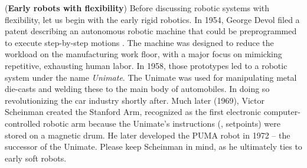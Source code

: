 (\textbf{Early robots with flexibility}) Before discussing robotic systems with flexibility, let us begin with the early rigid robotics. In 1954, George Devol filed a patent describing an autonomous robotic machine that could be preprogrammed to execute step-by-step motions \cite{Mickle2008}. The machine was designed to reduce the workload on the manufacturing work floor, with a major focus on mimicking repetitive, exhausting human labor. In 1958, those prototypes led to a robotic system under the name \emph{Unimate}. The Unimate was used for manipulating metal die-casts and welding these to the main body of automobiles. In doing so revolutionizing the car industry shortly after. Much later (1969), Victor Scheinman created the Stanford Arm, recognized as the first electronic computer-controlled robotic arm because the Unimate's instructions (\ie, setpoints) were stored on a magnetic drum. He later developed the PUMA robot in 1972 -- the successor of the Unimate. Please keep Scheinman in mind, as he ultimately ties to early soft robots. \vspace{0.085em}


